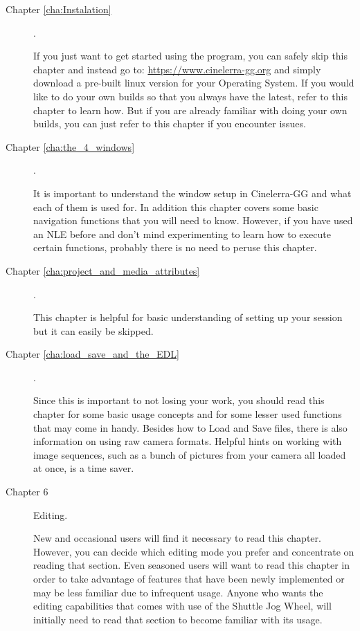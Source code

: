 \begin{description}
    \item[Chapter \ref{cha:Instalation} ] .

        If you just want to get started using the program, you can safely skip this chapter and instead go to:
        \url{https://www.cinelerra-gg.org}
        and simply download a pre-built linux version for your Operating System. If you would like to do your own builds so that you always have the latest, refer to this chapter to learn how. 
        But if you are already familiar with doing your own builds, you can just refer to this chapter if you encounter issues.
    \item[Chapter \ref{cha:the_4_windows} ] .

        It is important to understand the window setup in Cinelerra-GG and what each of them is used for. 
        In addition this chapter covers some basic navigation functions that you will need to know. 
        However, if you have used an NLE before and don’t mind experimenting to learn how to execute certain functions, probably there is no need to peruse this chapter.
    \item[Chapter \ref{cha:project_and_media_attributes}] .

        This chapter is helpful for basic understanding of setting up your session but it can easily be skipped.

    \item[Chapter \ref{cha:load_save_and_the_EDL}] .

        Since this is important to not losing your work, you should read this chapter for some basic usage concepts and for some lesser used functions that may come in handy. 
        Besides how to Load and Save files, there is also information on using raw camera formats. 
        Helpful hints on working with image sequences, such as a bunch of pictures from your camera all loaded at once, is a time saver.

    \item[Chapter 6] Editing.

        New and occasional users will find it necessary to read this chapter. However, you can decide which editing mode you prefer and concentrate on reading that section. 
        Even seasoned users will want to read this chapter in order to take advantage of features that have been newly implemented or may be less familiar due to infrequent usage. 
        Anyone who wants the editing capabilities that comes with use of the Shuttle Jog Wheel, will initially need to read that section to become familiar with its usage.


\end{description}

